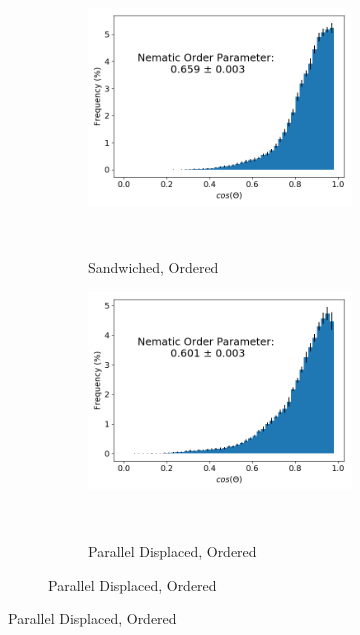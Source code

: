 \documentclass{article}
\begin{document}
  \begin{figure}[ht]

  \begin{subfigure}{\linewidth}
        \centering
        \begin{subfigure}{0.45\linewidth}
                \centering
                \includegraphics[width=\linewidth]{layered_nematic_order.png}
                \caption{Sandwiched, Ordered}~\label{fig:sandwich_nematic}
        \end{subfigure}%
        \begin{subfigure}{0.45\linewidth}
                \centering
                \includegraphics[width=\linewidth]{offset_nematic_order.png}
                \caption{Parallel Displaced, Ordered}~\label{fig:offset_nematic}

\end{subfigure}
\end{subfigure}
\end{figure}
\end{document}
